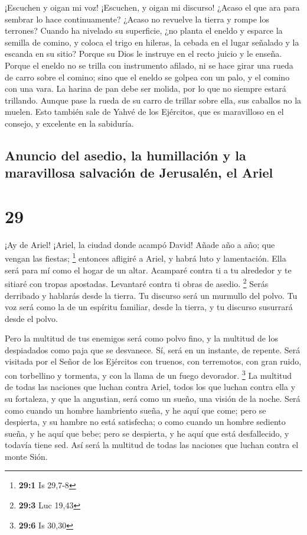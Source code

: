  ¡Escuchen y oigan mi voz! ¡Escuchen, y oigan mi
discurso!  ¿Acaso el que ara para sembrar lo hace
continuamente? ¿Acaso no revuelve la tierra y rompe los terrones?
 Cuando ha nivelado su superficie, ¿no planta el eneldo y
esparce la semilla de comino, y coloca el trigo en hileras, la cebada en
el lugar señalado y la escanda en su sitio?  Porque su
Dios le instruye en el recto juicio y le enseña.  Porque
el eneldo no se trilla con instrumento afilado, ni se hace girar una
rueda de carro sobre el comino; sino que el eneldo se golpea con un
palo, y el comino con una vara.  La harina de pan debe
ser molida, por lo que no siempre estará trillando. Aunque pase la rueda
de su carro de trillar sobre ella, sus caballos no la muelen.
 Esto también sale de Yahvé de los Ejércitos, que es
maravilloso en el consejo, y excelente en la sabiduría.

\hypertarget{anuncio-del-asedio-la-humillaciuxf3n-y-la-maravillosa-salvaciuxf3n-de-jerusaluxe9n-el-ariel}{%
\subsection{Anuncio del asedio, la humillación y la maravillosa
salvación de Jerusalén, el
Ariel}\label{anuncio-del-asedio-la-humillaciuxf3n-y-la-maravillosa-salvaciuxf3n-de-jerusaluxe9n-el-ariel}}

\hypertarget{section-28}{%
\section{29}\label{section-28}}

 ¡Ay de Ariel! ¡Ariel, la ciudad donde acampó David! Añade
año a año; que vengan las fiestas; \footnote{\textbf{29:1} Is 29,7-8}
 entonces afligiré a Ariel, y habrá luto y lamentación.
Ella será para mí como el hogar de un altar.  Acamparé
contra ti a tu alrededor y te sitiaré con tropas apostadas. Levantaré
contra ti obras de asedio. \footnote{\textbf{29:3} Luc 19,43}
 Serás derribado y hablarás desde la tierra. Tu discurso
será un murmullo del polvo. Tu voz será como la de un espíritu familiar,
desde la tierra, y tu discurso susurrará desde el polvo.

 Pero la multitud de tus enemigos será como polvo fino, y
la multitud de los despiadados como paja que se desvanece. Sí, será en
un instante, de repente.  Será visitada por el Señor de
los Ejércitos con truenos, con terremotos, con gran ruido, con
torbellino y tormenta, y con la llama de un fuego devorador. \footnote{\textbf{29:6}
  Is 30,30}  La multitud de todas las naciones que luchan
contra Ariel, todos los que luchan contra ella y su fortaleza, y que la
angustian, será como un sueño, una visión de la noche. 
Será como cuando un hombre hambriento sueña, y he aquí que come; pero se
despierta, y su hambre no está satisfecha; o como cuando un hombre
sediento sueña, y he aquí que bebe; pero se despierta, y he aquí que
está desfallecido, y todavía tiene sed. Así será la multitud de todas
las naciones que luchan contra el monte Sión.

